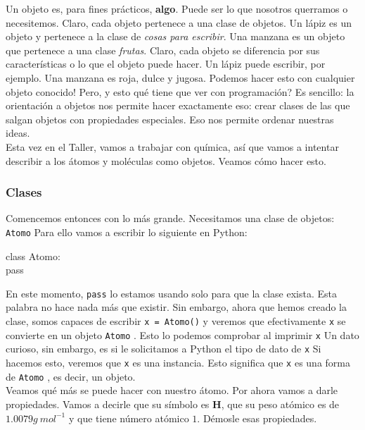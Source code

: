 \documentclass[10pt,letterpaper]{article}
\newcommand{\inlinecode}[1]{
\colorbox{light-gray}{\texttt{#1}}
}
\newenvironment{Code}
{
\begin{lrbox}{\selvestebox}%
\begin{minipage}{\dimexpr\columnwidth-2\fboxsep\relax}
\fontfamily{\ttdefault}\selectfont
}
{\end{minipage}\end{lrbox}%
\begin{center}
\colorbox{light-gray}{\usebox{\selvestebox}}
\end{center}
}
\begin{document}
Un objeto es, para fines pr\'acticos, \textbf{algo}. Puede ser lo que nosotros querramos o necesitemos. Claro, cada objeto pertenece a una clase de objetos. Un l\'apiz es un objeto y pertenece a la clase de \emph{cosas para escribir}. Una manzana es un objeto que pertenece a una clase \emph{frutas}. Claro, cada objeto se diferencia por sus caracter\'isticas o lo que el objeto puede hacer. Un l\'apiz puede escribir, por ejemplo. Una manzana es roja, dulce y jugosa. Podemos hacer esto con cualquier objeto conocido! Pero, y esto qu\'e tiene que ver con programaci\'on? Es sencillo: la orientaci\'on a objetos nos permite hacer exactamente eso: crear clases de las que salgan objetos con propiedades especiales. Eso nos permite ordenar nuestras ideas.\\

Esta vez en el Taller, vamos a trabajar con qu\'imica, as\'i que vamos a intentar describir a los \'atomos y mol\'eculas como objetos. Veamos c\'omo hacer esto.

\subsubsection{Clases}
Comencemos entonces con lo m\'as grande. Necesitamos una clase de objetos: \inlinecode{Atomo} Para ello vamos a escribir lo siguiente en Python:

\begin{Code}
class Atomo:\\
\hspace*{4mm} pass
\end{Code}

En este momento, \inlinecode{pass} lo estamos usando solo para que la clase exista. Esta palabra no hace nada m\'as que existir. Sin embargo, ahora que hemos creado la clase, somos capaces de escribir \inlinecode{x = Atomo()} y veremos que efectivamente \inlinecode{x} se convierte en un objeto \inlinecode{Atomo}. Esto lo podemos comprobar al imprimir \inlinecode{x} Un dato curioso, sin embargo, es si le solicitamos a Python el tipo de dato de \inlinecode{x} Si hacemos esto, veremos que \inlinecode{x} es una instancia. Esto significa que \inlinecode{x} es una forma de \inlinecode{Atomo}, es decir, un objeto.\\

Veamos qu\'e m\'as se puede hacer con nuestro \'atomo. Por ahora vamos a darle propiedades. Vamos a decirle que su s\'imbolo es \textbf{H}, que su peso at\'omico es de $1.0079 g\ mol^{-1}$ y que tiene n\'umero at\'omico $1$. D\'emosle esas propiedades.
\end{document}
